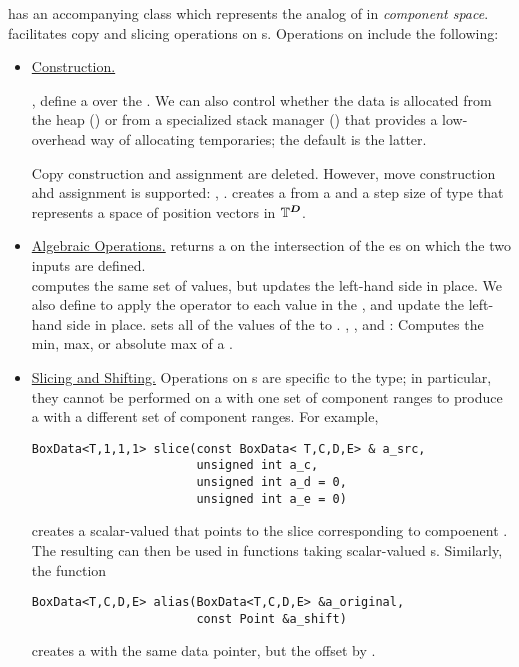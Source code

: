 \documentclass[12pt]{article}
\newcommand{\lhs}{left-hand side }
\newcommand{\BoxData}{\code{BoxData} }
\begin{document}
 has an accompanying class  which represents the analog of  in \textit{component space}.  facilitates copy and slicing operations on s.
Operations on \BoxData include the following:

\begin{itemize}
\item \underline{Construction.}

,  define a  over the . 
We can also control whether the data is allocated from the heap () or from a specialized stack manager () that provides a low-overhead way of allocating temporaries; the default is the latter.

Copy construction and assignment are deleted. However, move construction ahd assignment is supported:
, .
 creates a  from a  and a step size of type  that represents a space of position vectors in $\mathbb{T}^{\boldsymbol{D}}$.

\item \underline{Algebraic Operations.} 
 returns a  on the intersection of the es on which the two inputs are defined. \\  computes the same set of values, but updates the \lhs in place. We also define  to apply the operator to each value in the , and update the \lhs in place.  sets all of the values of the  to . , , and : Computes the min, max, or absolute max of a .
\item
\underline{Slicing and Shifting.}
Operations on s are specific to the type; in particular, they cannot be performed on a  with one set of component ranges to produce a  with a different set of component ranges. For example, 
\begin{verbatim}
BoxData<T,1,1,1> slice(const BoxData< T,C,D,E> & a_src, 
                       unsigned int a_c, 
                       unsigned int a_d = 0,
                       unsigned int a_e = 0)
\end{verbatim}
creates a scalar-valued  that points to the slice corresponding to compoenent . The resulting  can then be used in functions taking scalar-valued s. Similarly, the function 
\begin{verbatim}
BoxData<T,C,D,E> alias(BoxData<T,C,D,E> &a_original, 
                       const Point &a_shift) 
\end{verbatim}
creates a  with the same data pointer, but the  offset by . 

\end{itemize}
\end{document}
